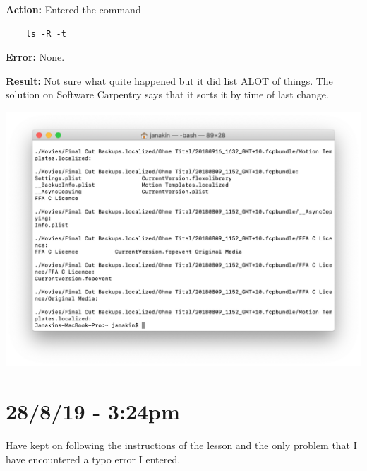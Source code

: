 \documentclass{article}
\begin{document}
\textbf{Action:} Entered the command \begin{verbatim}
    ls -R -t
\end{verbatim}

\textbf{Error:} None.

\textbf{Result:} Not sure what quite happened but it did list ALOT of things. The solution on Software Carpentry says that it sorts it by time of last change.

\includegraphics[width=\textwidth]{figb.png}

\section*{28/8/19 - 3:24pm}

Have kept on following the instructions of the lesson and the only problem that I have encountered a typo error I entered.
\end{document}
